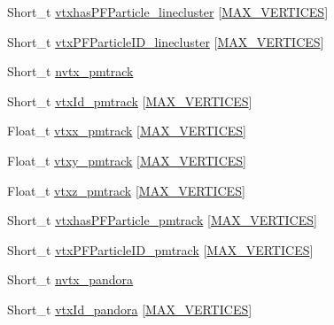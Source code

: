 \begin{DoxyCompactItemize}
\item 
Short\-\_\-t \hyperlink{classanatree_a8b34d2e986cff37efa6366b6fac906aa}{vtxhas\-P\-F\-Particle\-\_\-linecluster} \mbox{[}\hyperlink{anatree__core__v09410002_8h_a6ac49acb0970e608315ca232a9fc8828}{M\-A\-X\-\_\-\-V\-E\-R\-T\-I\-C\-E\-S}\mbox{]}
\item 
Short\-\_\-t \hyperlink{classanatree_a657fe1e33d56c77e99419c64c36df3e9}{vtx\-P\-F\-Particle\-I\-D\-\_\-linecluster} \mbox{[}\hyperlink{anatree__core__v09410002_8h_a6ac49acb0970e608315ca232a9fc8828}{M\-A\-X\-\_\-\-V\-E\-R\-T\-I\-C\-E\-S}\mbox{]}
\item 
Short\-\_\-t \hyperlink{classanatree_aea614ee837b25918997ef74cd606f47e}{nvtx\-\_\-pmtrack}
\item 
Short\-\_\-t \hyperlink{classanatree_ac4dbad19aa6ecea4cd20fc7853e57dad}{vtx\-Id\-\_\-pmtrack} \mbox{[}\hyperlink{anatree__core__v09410002_8h_a6ac49acb0970e608315ca232a9fc8828}{M\-A\-X\-\_\-\-V\-E\-R\-T\-I\-C\-E\-S}\mbox{]}
\item 
Float\-\_\-t \hyperlink{classanatree_abdcd02d6a678ed35fd1cd7813e37e073}{vtxx\-\_\-pmtrack} \mbox{[}\hyperlink{anatree__core__v09410002_8h_a6ac49acb0970e608315ca232a9fc8828}{M\-A\-X\-\_\-\-V\-E\-R\-T\-I\-C\-E\-S}\mbox{]}
\item 
Float\-\_\-t \hyperlink{classanatree_ad78994567ecddbe0480f7bc23724981c}{vtxy\-\_\-pmtrack} \mbox{[}\hyperlink{anatree__core__v09410002_8h_a6ac49acb0970e608315ca232a9fc8828}{M\-A\-X\-\_\-\-V\-E\-R\-T\-I\-C\-E\-S}\mbox{]}
\item 
Float\-\_\-t \hyperlink{classanatree_a7e5de17f424482581b756ef1d657d981}{vtxz\-\_\-pmtrack} \mbox{[}\hyperlink{anatree__core__v09410002_8h_a6ac49acb0970e608315ca232a9fc8828}{M\-A\-X\-\_\-\-V\-E\-R\-T\-I\-C\-E\-S}\mbox{]}
\item 
Short\-\_\-t \hyperlink{classanatree_a401d11b726242649173a75d0d13a00ac}{vtxhas\-P\-F\-Particle\-\_\-pmtrack} \mbox{[}\hyperlink{anatree__core__v09410002_8h_a6ac49acb0970e608315ca232a9fc8828}{M\-A\-X\-\_\-\-V\-E\-R\-T\-I\-C\-E\-S}\mbox{]}
\item 
Short\-\_\-t \hyperlink{classanatree_a9532423e7e4c050a587f1ec3eeaa2def}{vtx\-P\-F\-Particle\-I\-D\-\_\-pmtrack} \mbox{[}\hyperlink{anatree__core__v09410002_8h_a6ac49acb0970e608315ca232a9fc8828}{M\-A\-X\-\_\-\-V\-E\-R\-T\-I\-C\-E\-S}\mbox{]}
\item 
Short\-\_\-t \hyperlink{classanatree_a7c05547f4a8b01e49426ef990664752a}{nvtx\-\_\-pandora}
\item 
Short\-\_\-t \hyperlink{classanatree_ac9363722862108c4539de33bc14990f2}{vtx\-Id\-\_\-pandora} \mbox{[}\hyperlink{anatree__core__v09410002_8h_a6ac49acb0970e608315ca232a9fc8828}{M\-A\-X\-\_\-\-V\-E\-R\-T\-I\-C\-E\-S}\mbox{]}

\end{DoxyCompactItemize}
